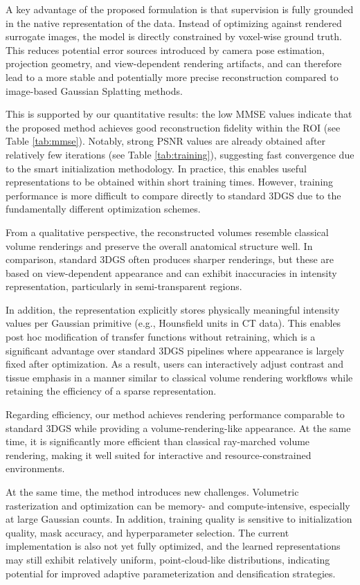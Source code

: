\documentclass[runningheads]{llncs}
\begin{document}
A key advantage of the proposed formulation is that supervision is fully grounded in the native representation of the data. Instead of optimizing against rendered surrogate images, the model is directly constrained by voxel-wise ground truth. This reduces potential error sources introduced by camera pose estimation, projection geometry, and view-dependent rendering artifacts, and can therefore lead to a more stable and potentially more precise reconstruction compared to image-based Gaussian Splatting methods.

This is supported by our quantitative results: the low MMSE values indicate that the proposed method achieves good reconstruction fidelity within the ROI (see Table \ref{tab:mmse}). Notably, strong PSNR values are already obtained after relatively few iterations (see Table \ref{tab:training}), suggesting fast convergence due to the smart initialization methodology. In practice, this enables useful representations to be obtained within short training times. However, training performance is more difficult to compare directly to standard 3DGS due to the fundamentally different optimization schemes.

From a qualitative perspective, the reconstructed volumes resemble classical volume renderings and preserve the overall anatomical structure well. In comparison, standard 3DGS often produces sharper renderings, but these are based on view-dependent appearance and can exhibit inaccuracies in intensity representation, particularly in semi-transparent regions.

In addition, the representation explicitly stores physically meaningful intensity values per Gaussian primitive (e.g., Hounsfield units in CT data). This enables post hoc modification of transfer functions without retraining, which is a significant advantage over standard 3DGS pipelines where appearance is largely fixed after optimization. As a result, users can interactively adjust contrast and tissue emphasis in a manner similar to classical volume rendering workflows while retaining the efficiency of a sparse representation.

Regarding efficiency, our method achieves rendering performance comparable to standard 3DGS while providing a volume-rendering-like appearance. At the same time, it is significantly more efficient than classical ray-marched volume rendering, making it well suited for interactive and resource-constrained environments.

At the same time, the method introduces new challenges. Volumetric rasterization and optimization can be memory- and compute-intensive, especially at large Gaussian counts. In addition, training quality is sensitive to initialization quality, mask accuracy, and hyperparameter selection. The current implementation is also not yet fully optimized, and the learned representations may still exhibit relatively uniform, point-cloud-like distributions, indicating potential for improved adaptive parameterization and densification strategies.
\end{document}
